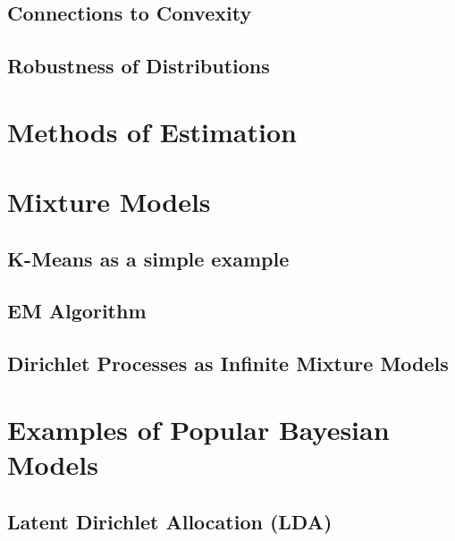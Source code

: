 \documentclass[a4paper]{article}
\begin{document}
\subsection{Connections to Convexity}

\subsection{Robustness of Distributions}

\section{Methods of Estimation}

\section{Mixture Models}
\subsection{K-Means as a simple example}
\subsection{EM Algorithm}
\subsection{Dirichlet Processes as Infinite Mixture Models}

\section{Examples of Popular Bayesian Models}
\subsection{Latent Dirichlet Allocation (LDA)}
 


\end{document}
